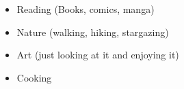 %
%
%

{
	\vspace{1em}
	\begin{itemize}
		\item Reading (Books, comics, manga)
		\item Nature (walking, hiking, stargazing)                    
		\item Art (just looking at it and enjoying it)
		\item Cooking
	\end{itemize}
}

